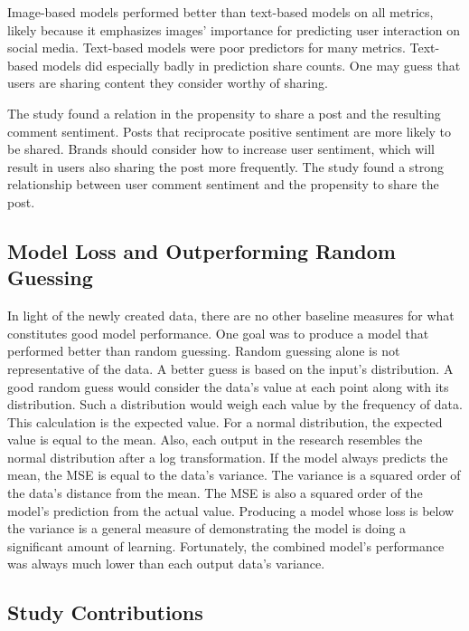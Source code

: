 \documentclass{article}
\begin{document}
Image-based models performed better than text-based models on all metrics, likely because it emphasizes images' importance for predicting user interaction on social media. Text-based models were poor predictors for many metrics. Text-based models did especially badly in prediction share counts. One may guess that users are sharing content they consider worthy of sharing. 


The study found a relation in the propensity to share a post and the resulting comment sentiment. Posts that reciprocate positive sentiment are more likely to be shared. Brands should consider how to increase user sentiment, which will result in users also sharing the post more frequently. The study found a strong relationship between user comment sentiment and the propensity to share the post.

\subsection{Model Loss and Outperforming Random Guessing}
In light of the newly created data, there are no other baseline measures for what constitutes good model performance. One goal was to produce a model that performed better than random guessing. Random guessing alone is not representative of the data. A better guess is based on the input's distribution. A good random guess would consider the data's value at each point along with its distribution. Such a distribution would weigh each value by the frequency of data. This calculation is the expected value. For a normal distribution, the expected value is equal to the mean. Also, each output in the research resembles the normal distribution after a log transformation. If the model always predicts the mean, the MSE is equal to the data's variance. The variance is a squared order of the data's distance from the mean. The MSE is also a squared order of the model's prediction from the actual value. Producing a model whose loss is below the variance is a general measure of demonstrating the model is doing a significant amount of learning. Fortunately, the combined model's performance was always much lower than each output data's variance.

\subsection{Study Contributions}
\end{document}

